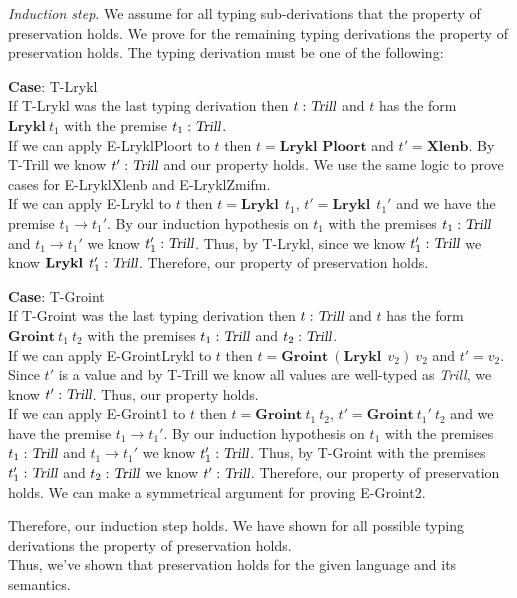 \documentclass[12pt, fleqn]{article}
\begin{document}
\begin{enumerate}[(a)]
    \emph{Induction step}. We assume for all typing sub-derivations that the property of preservation holds. We prove for the remaining typing derivations the property of preservation holds. The typing derivation must be one of the following:

    \textbf{Case}: T-Lrykl\\
    If T-Lrykl was the last typing derivation then $t : \textsl{Trill}$ and $t$ has the form $\textbf{Lrykl}\:t_1$ with the premise $t_1 : \textsl{Trill}$.\\
    If we can apply E-LryklPloort to $t$ then $t = \textbf{Lrykl Ploort}$ and $t' = \textbf{Xlenb}$. By T-Trill we know $t' : \textsl{Trill}$ and our property holds. We use the same logic to prove cases for E-LryklXlenb and E-LryklZmifm.\\
    If we can apply E-Lrykl to $t$ then $t = \textbf{Lrykl}\:\:t_1$, $t' = \textbf{Lrykl}\:\:t_1'$ and we have the premise $t_1 \rightarrow t_1'$. By our induction hypothesis on $t_1$ with the premises $t_1 : \textsl{Trill}$ and $t_1 \rightarrow t_1'$ we know $t_1' : \textsl{Trill}$. Thus, by T-Lrykl, since we know $t_1' : \textsl{Trill}$ we know $\textbf{Lrykl}\:\:t_1' : \textsl{Trill}$. Therefore, our property of preservation holds.

    \textbf{Case}: T-Groint\\
    If T-Groint was the last typing derivation then $t : \textsl{Trill}$ and $t$ has the form $\textbf{Groint}\:t_1\:t_2$ with the premises $t_1 : \textsl{Trill}$ and $t_2 : \textsl{Trill}$.\\
    If we can apply E-GrointLrykl to $t$ then $t = \textbf{Groint}\:(\textbf{Lrykl}\:\:v_2)\:v_2$ and $t' = v_2$. Since $t'$ is a value and by T-Trill we know all values are well-typed as \textsl{Trill}, we know $t' : \textsl{Trill}$. Thus, our property holds.\\
    If we can apply E-Groint1 to $t$ then $t = \textbf{Groint}\:t_1\:t_2$, $t' = \textbf{Groint}\:t_1'\:t_2$ and we have the premise $t_1 \rightarrow t_1'$. By our induction hypothesis on $t_1$ with the premises $t_1 : \textsl{Trill}$ and $t_1 \rightarrow t_1'$ we know $t_1': \textsl{Trill}$. Thus, by T-Groint with the premises $t_1': \textsl{Trill}$ and $t_2 : \textsl{Trill}$ we know $t' : \textsl{Trill}$. Therefore, our property of preservation holds. We can make a symmetrical argument for proving E-Groint2.

    Therefore, our induction step holds. We have shown for all possible typing derivations the property of preservation holds.\\
    Thus, we've shown that preservation holds for the given language and its semantics. 

\end{enumerate}
\end{document}
